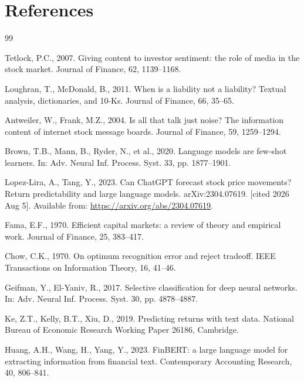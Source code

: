 \documentclass[12pt,a4paper]{article}
\begin{document}
\section{References}
\renewcommand{\refname}{}
\vspace{-2\baselineskip}
\begin{singlespace}
\begin{thebibliography}{99}
\setlength{\itemsep}{0pt}
\setlength{\parskip}{0pt}

Tetlock, P.C., 2007. Giving content to investor sentiment: the role of media in the
stock market. Journal of Finance, 62, 1139--1168.

Loughran, T., McDonald, B., 2011. When is a liability not a liability? Textual
analysis, dictionaries, and 10-Ks. Journal of Finance, 66, 35--65.

Antweiler, W., Frank, M.Z., 2004. Is all that talk just noise? The information
content of internet stock message boards. Journal of Finance, 59, 1259--1294.

Brown, T.B., Mann, B., Ryder, N., et al., 2020. Language models are few-shot
learners. In: Adv. Neural Inf. Process. Syst. 33, pp. 1877--1901.

Lopez-Lira, A., Tang, Y., 2023. Can ChatGPT forecast stock price movements? Return
predictability and large language models. arXiv:2304.07619. [cited 2026 Aug 5].
Available from: \url{https://arxiv.org/abs/2304.07619}.

Fama, E.F., 1970. Efficient capital markets: a review of theory and empirical work.
Journal of Finance, 25, 383--417.

Chow, C.K., 1970. On optimum recognition error and reject tradeoff. IEEE
Transactions on Information Theory, 16, 41--46.

Geifman, Y., El-Yaniv, R., 2017. Selective classification for deep neural networks.
In: Adv. Neural Inf. Process. Syst. 30, pp. 4878--4887.

Ke, Z.T., Kelly, B.T., Xiu, D., 2019. Predicting returns with text data. National
Bureau of Economic Research Working Paper 26186, Cambridge.

Huang, A.H., Wang, H., Yang, Y., 2023. FinBERT: a large language model for
extracting information from financial text. Contemporary Accounting Research, 40,
806--841.


\end{thebibliography}
\end{singlespace}
\end{document}
